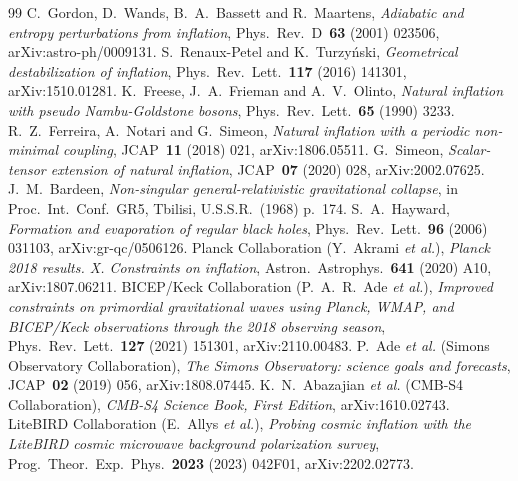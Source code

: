 \documentclass[11pt]{article}
\theoremstyle{definition}
\begin{document}
\begin{thebibliography}{99}
 C.~Gordon, D.~Wands, B.~A.~Bassett and R.~Maartens, \emph{Adiabatic and entropy perturbations from inflation}, Phys.\ Rev.\ D~\textbf{63} (2001) 023506, arXiv:astro-ph/0009131.
 S.~Renaux-Petel and K.~Turzy\'nski, \emph{Geometrical destabilization of inflation}, Phys.\ Rev.\ Lett.~\textbf{117} (2016) 141301, arXiv:1510.01281.
 K.~Freese, J.~A.~Frieman and A.~V.~Olinto, \emph{Natural inflation with pseudo Nambu-Goldstone bosons}, Phys.\ Rev.\ Lett.~\textbf{65} (1990) 3233.
 R.~Z.~Ferreira, A.~Notari and G.~Simeon, \emph{Natural inflation with a periodic non-minimal coupling}, JCAP~\textbf{11} (2018) 021, arXiv:1806.05511.
 G.~Simeon, \emph{Scalar-tensor extension of natural inflation}, JCAP~\textbf{07} (2020) 028, arXiv:2002.07625.
 J.~M.~Bardeen, \emph{Non-singular general-relativistic gravitational collapse}, in Proc.\ Int.\ Conf.\ GR5, Tbilisi, U.S.S.R.\ (1968) p.~174.
 S.~A.~Hayward, \emph{Formation and evaporation of regular black holes}, Phys.\ Rev.\ Lett.~\textbf{96} (2006) 031103, arXiv:gr-qc/0506126.
 Planck Collaboration (Y.~Akrami \emph{et al.}), \emph{Planck 2018 results. X. Constraints on inflation}, Astron.\ Astrophys.~\textbf{641} (2020) A10, arXiv:1807.06211.
 BICEP/Keck Collaboration (P.~A.~R.~Ade \emph{et al.}), \emph{Improved constraints on primordial gravitational waves using Planck, WMAP, and BICEP/Keck observations through the 2018 observing season}, Phys.\ Rev.\ Lett.~\textbf{127} (2021) 151301, arXiv:2110.00483.
 P.~Ade \emph{et al.} (Simons Observatory Collaboration), \emph{The Simons Observatory: science goals and forecasts}, JCAP~\textbf{02} (2019) 056, arXiv:1808.07445.
 K.~N.~Abazajian \emph{et al.} (CMB-S4 Collaboration), \emph{CMB-S4 Science Book, First Edition}, arXiv:1610.02743.
 LiteBIRD Collaboration (E.~Allys \emph{et al.}), \emph{Probing cosmic inflation with the LiteBIRD cosmic microwave background polarization survey}, Prog.\ Theor.\ Exp.\ Phys.~\textbf{2023} (2023) 042F01, arXiv:2202.02773.
\end{thebibliography}
\end{document}
